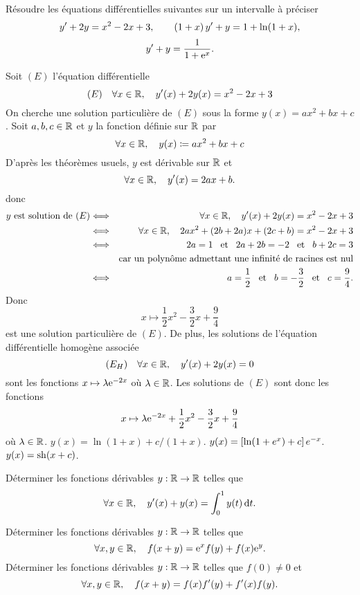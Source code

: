 \documentclass{magnolia}
\begin{document}
Résoudre les équations différentielles suivantes sur un intervalle à préciser
\[y'+2y=x^2-2x+3, \qquad
  \left(1+x\right)y'+y=1+\ln (1+x),\]
\[y'+y=\frac{1}{1+{\rm e}^x}.\]
\begin{sol}
\begin{questions}
\question Soit $(E)$ l'équation différentielle
 \[(E) \quad \forall x\in\mathbb{R},\quad y'(x)+2y(x)=x^2-2x+3\]
 On cherche une solution particulière de $(E)$ sous la forme $y(x)=ax^2+bx+c$. Soit $a, b, c\in\mathbb{R}$ et $y$ la fonction définie sur $\mathbb{R}$ par
 \[\forall x\in\mathbb{R} ,\quad y(x)\coloneqq ax^2+bx+c\]
 D'après les théorèmes usuels, $y$ est dérivable sur $\mathbb{R}$ et
\[\forall x\in\mathbb{R},\quad y'(x)= 2ax+b.\]
donc
\begin{eqnarray*}
\text{$y$ est solution de $(E)$}
&\ssi& \forall x\in\R\qsep y'(x)+2y(x)=x^2-2x+3\\
&\ssi& \forall x\in\R\qsep 2ax^2+(2b+2a)x+(2c+b)=x^2-2x+3\\
&\ssi& 2a = 1 \et 2a+2b=-2 \et b+2c=3\\
&    & \text{car un polynôme admettant une infinité de racines est nul}\\
&\ssi& a = \frac{1}{2} \et b=-\frac{3}{2} \et c=\frac{9}{4}.
\end{eqnarray*}
Donc
\[x\mapsto \frac{1}{2}x^2-\frac{3}{2}x+\frac{9}{4}\]
est une solution particulière de $(E)$. De plus, les solutions de l'équation différentielle homogène associée
\[(E_H) \quad \forall x\in\mathbb{R},\quad y'(x)+2y(x)=0\]
sont les fonctions $x\mapsto \lambda{\rm e}^{-2x}$ où $\lambda\in\mathbb{R}$. Les solutions de $(E)$ sont donc les fonctions
\[x\mapsto \lambda{\rm e}^{-2x}+\frac{1}{2}x^2-\frac{3}{2}x+\frac{9}{4}\]
où $\lambda\in\mathbb{R}$.
\question $y(x)=\ln(1+x)+c/(1+x)$.
\question $y(x)=\left[\ln(1+e^x)+c\right]e^{-x}$.
\question $y(x)=\operatorname{sh}(x+c)$.
\end{questions}
\end{sol}

Déterminer les fonctions dérivables $y:\mathbb{R}\to\mathbb{R}$ telles que
\[\forall x\in\mathbb{R},\quad y'(x)+y(x)=\int_{0}^{1} y(t)\,\text{d}t.\]

\begin{questions}
\question Déterminer les fonctions dérivables $y:\mathbb{R}\to\mathbb{R}$ telles que
\[\forall x,y\in\mathbb{R},\quad f(x+y)={\rm e}^x f(y)+f(x){\rm e}^y.\]
\question Déterminer les fonctions dérivables $y:\mathbb{R}\to\mathbb{R}$ telles que $f(0)\neq 0$ et
\[\forall x,y\in\mathbb{R},\quad f(x+y)=f(x)f'(y)+f'(x)f(y).\]
\end{questions}
\end{document}
